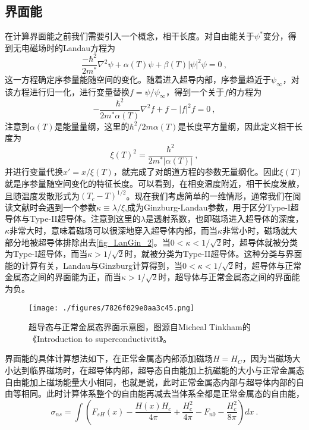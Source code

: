 \subsection{界面能}
在计算界面能之前我们需要引入一个概念，相干长度。对自由能关于$\psi^*$变分，得到无电磁场时的Landau方程为
\begin{equation}
\frac{-\hbar^2}{2m^*}\nabla^2 \psi + \alpha(T)\psi + \beta(T)|\psi|^2 \psi = 0~,
\end{equation}
这一方程确定序参量能随空间的变化。随着进入超导内部，序参量趋近于$\psi_{\infty}$，对该方程进行归一化，进行变量替换$f= \psi/\psi_{\infty}$，得到一个关于$f$的方程为
\begin{equation}
-\frac{\hbar^2}{2m^* \alpha(T)} \nabla^2 f + f - |f|^2 f =0 ~,
\end{equation}
注意到$\alpha(T)$是能量量纲，这里的$\hbar^2/2m \alpha(T)$是长度平方量纲，因此定义相干长度为
\begin{equation}
\xi(T)^2 =\frac{\hbar^2}{2m^* |\alpha(T)|}~,
\end{equation}
并进行变量代换$x' = x/\xi(T)$，就完成了对朗道方程的参数无量纲化。因此$\xi(T)$就是序参量随空间变化的特征长度。可以看到，在相变温度附近，相干长度发散，且随温度发散形式为$(T_c-T)^{1/2}$。现在我们考虑简单的一维情形，通常我们在阅读文献时会遇到一个参数$\kappa \equiv \lambda/\xi$,成为Ginzburg-Landau参数，用于区分Type-I超导体与Type-II超导体。注意到这里的$\lambda$是透射系数，也即磁场进入超导体的深度，$\kappa$非常大时，意味着磁场可以很深地穿入超导体内部，而当$\kappa$非常小时，磁场就大部分地被超导体排除出去\autoref{fig_LanGin_2}。当$0<\kappa<1/\sqrt{2}$时，超导体就被分类为Type-I超导体，而当$\kappa>1/\sqrt{2}$时，就被分类为Type-II超导体。这种分类与界面能的计算有关，Landau与Ginzburg计算得到，当$0<\kappa<1/\sqrt{2}$时，超导体与正常金属态之间的界面能为正，而当$\kappa>1/\sqrt{2}$时，超导体与正常金属态之间的界面能为负。
\begin{figure}[ht]
\centering
\texttt{[image: ./figures/7826f029e0aa3c45.png]}
\caption{超导态与正常金属态界面示意图，图源自Micheal Tinkham的《Introduction to superconductivitt》。} \label{fig_LanGin_2}
\end{figure}
界面能的具体计算想法如下，在正常金属态内部添加磁场$H=H_C$，因为当磁场大小达到临界磁场时，在超导体内部，超导态自由能加上抗磁能的大小与正常金属态自由能加上磁场能量大小相同，也就是说，此时正常金属态内部与超导体内部的自由等相同。此时计算体系整个的自由能再减去当体系全都是正常金属态的自由能，
\begin{equation}
\sigma_{ns} = \int \left( F_{sH}(x) - \frac{H(x)H_c}{4\pi} + \frac{H_c^2}{4\pi} -F_{n0} - \frac{H_c^2}{8\pi}\right)dx~.
\label{eq_free_energy}
\end{equation}
